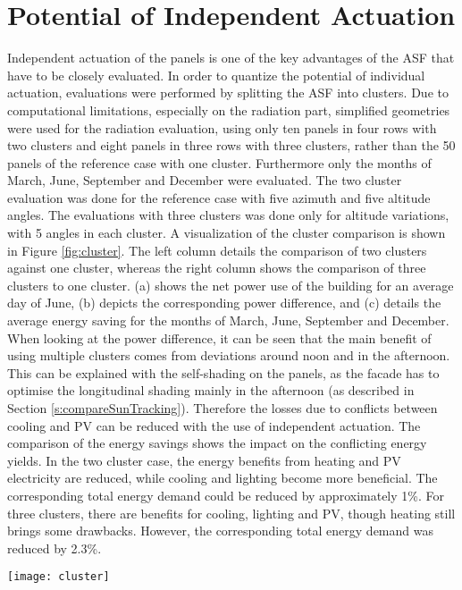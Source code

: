 \section{Potential of Independent Actuation}
	Independent actuation of the panels is one of the key advantages of the ASF that have to be closely evaluated. In order to quantize the potential of individual actuation, evaluations were performed by splitting the ASF into clusters. Due to computational limitations, especially on the radiation part, simplified geometries were used for the radiation evaluation, using only ten panels in four rows with two clusters and eight panels in three rows with three clusters, rather than the 50 panels of the reference case with one cluster. Furthermore only the months of March, June, September and December were evaluated. The two cluster evaluation was done for the reference case with five azimuth and five altitude angles. The evaluations with three clusters was done only for altitude variations, with 5 angles in each cluster. A visualization of the cluster comparison is shown in Figure \ref{fig:cluster}. The left column details the comparison of two clusters against one cluster, whereas the right column shows the comparison of three clusters to one cluster. (a) shows the net power use of the building for an average day of June, (b) depicts the corresponding power difference, and (c) details the average energy saving for the months of March, June, September and December. When looking at the power difference, it can be seen that the main benefit of using multiple clusters comes from deviations around noon and in the afternoon. This can be explained with the self-shading on the panels, as the facade has to optimise the longitudinal shading mainly in the afternoon (as described in Section \ref{s:compareSunTracking}). Therefore the losses due to conflicts between cooling and PV can be reduced with the use of independent actuation. The comparison of the energy savings shows the impact on the conflicting energy yields. In the two cluster case, the energy benefits from heating and PV electricity are reduced, while cooling and lighting become more beneficial. The corresponding total energy demand could be reduced by approximately 1\%. For three clusters, there are benefits for cooling, lighting and PV, though heating still brings some drawbacks. However, the corresponding total energy demand was reduced by 2.3\%.

	\begin{figure*}
		\begin{center}
		\texttt{[image: cluster]}
		\caption{Cluster analysis of the ASF. The left column details the analysis with 2 clusters, whereas the right column corresponds to the 3 cluster analysis. (a) shows the average power use per room area for the month of June, (b) details the corresponding power difference, and (c) visualizes the total energy savings, averaged for the months of March, June, September and December.}
		\label{fig:cluster}
		\end{center}
	\end{figure*}
